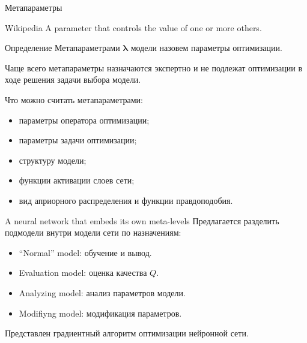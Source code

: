 \documentclass[usenames,dvipsnames,10pt,pdf,utf8,russian,aspectratio=43]{beamer}
\begin{document}
\begin{frame}{Метапараметры}
\begin{block}{Wikipedia}
A parameter that controls the value of one or more others.
\end{block}

\begin{block}{Определение}
Метапараметрами $\boldsymbol{\lambda}$ модели назовем параметры оптимизации.
\end{block}

Чаще всего метапараметры назначаются экспертно и не подлежат оптимизации в ходе решения задачи выбора модели. 

Что можно считать метапараметрами:
\begin{itemize}
\item параметры оператора оптимизации;
\item параметры задачи оптимизации;
\item структуру модели;
\item функции активации слоев сети;
\item вид априорного распределения и функции правдоподобия.
\end{itemize}
\end{frame}


\begin{frame}{A neural network that embeds its own meta-levels}
Предлагается разделить подмодели внутри модели сети по назначениям:
\begin{itemize}
\item ``Normal'' model: обучение и вывод.
\item Evaluation model: оценка качества $Q$.
\item Analyzing model: анализ параметров модели.
\item Modifiyng model: модификация параметров.
\end{itemize}

Представлен градиентный алгоритм оптимизации нейронной сети.
\end{frame}
\end{document}
